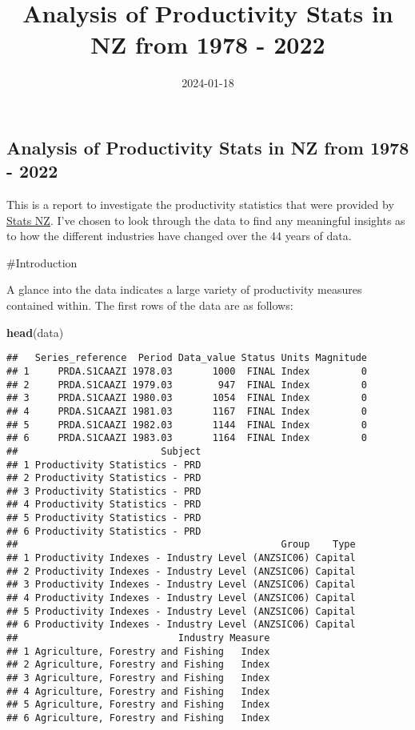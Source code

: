 \documentclass[
]{article}
\title{Analysis of Productivity Stats in NZ from 1978 - 2022}
\author{}
\date{\vspace{-2.5em}2024-01-18}
\newenvironment{Shaded}{\begin{snugshade}}{\end{snugshade}}
\newcommand{\FunctionTok}[1]{\textcolor[rgb]{0.13,0.29,0.53}{\textbf{#1}}}
\newcommand{\NormalTok}[1]{#1}
\begin{document}
\maketitle

\hypertarget{analysis-of-productivity-stats-in-nz-from-1978---2022}{%
\subsection{Analysis of Productivity Stats in NZ from 1978 -
2022}\label{analysis-of-productivity-stats-in-nz-from-1978---2022}}

This is a report to investigate the productivity statistics that were
provided by
\href{https://www.stats.govt.nz/large-datasets/csv-files-for-download/}{Stats
NZ}. I've chosen to look through the data to find any meaningful
insights as to how the different industries have changed over the 44
years of data.

\#Introduction

A glance into the data indicates a large variety of productivity
measures contained within. The first rows of the data are as follows:

\begin{Shaded}
\begin{Highlighting}[]
\FunctionTok{head}\NormalTok{(data)}
\end{Highlighting}
\end{Shaded}

\begin{verbatim}
##   Series_reference  Period Data_value Status Units Magnitude
## 1     PRDA.S1CAAZI 1978.03       1000  FINAL Index         0
## 2     PRDA.S1CAAZI 1979.03        947  FINAL Index         0
## 3     PRDA.S1CAAZI 1980.03       1054  FINAL Index         0
## 4     PRDA.S1CAAZI 1981.03       1167  FINAL Index         0
## 5     PRDA.S1CAAZI 1982.03       1144  FINAL Index         0
## 6     PRDA.S1CAAZI 1983.03       1164  FINAL Index         0
##                         Subject
## 1 Productivity Statistics - PRD
## 2 Productivity Statistics - PRD
## 3 Productivity Statistics - PRD
## 4 Productivity Statistics - PRD
## 5 Productivity Statistics - PRD
## 6 Productivity Statistics - PRD
##                                              Group    Type
## 1 Productivity Indexes - Industry Level (ANZSIC06) Capital
## 2 Productivity Indexes - Industry Level (ANZSIC06) Capital
## 3 Productivity Indexes - Industry Level (ANZSIC06) Capital
## 4 Productivity Indexes - Industry Level (ANZSIC06) Capital
## 5 Productivity Indexes - Industry Level (ANZSIC06) Capital
## 6 Productivity Indexes - Industry Level (ANZSIC06) Capital
##                            Industry Measure
## 1 Agriculture, Forestry and Fishing   Index
## 2 Agriculture, Forestry and Fishing   Index
## 3 Agriculture, Forestry and Fishing   Index
## 4 Agriculture, Forestry and Fishing   Index
## 5 Agriculture, Forestry and Fishing   Index
## 6 Agriculture, Forestry and Fishing   Index
\end{verbatim}
\end{document}
